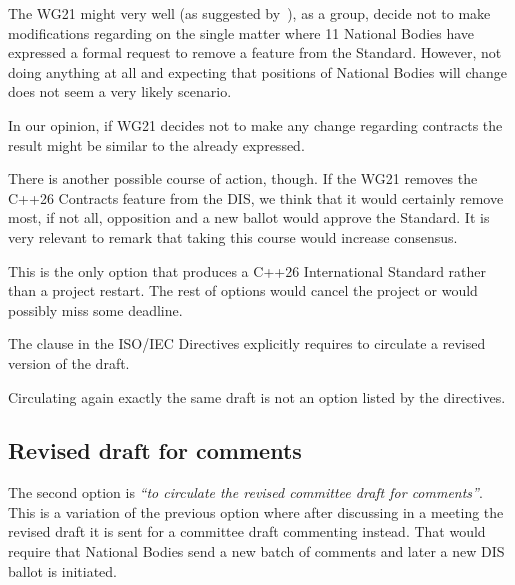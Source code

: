 The WG21 might very well (as suggested by~\cite{p4433r0}), as a group, decide
not to make modifications regarding on the single matter where 11 National
Bodies have expressed a formal request to remove a feature from the Standard.
However, not doing anything at all and expecting that positions of National
Bodies will change does not seem a very likely scenario.

In our opinion, if WG21 decides not to make any change regarding contracts the
result might be similar to the already expressed.

There is another possible course of action, though. If the WG21 removes the
C++26 Contracts feature from the DIS, we think that it would certainly
remove most, if not all, opposition and a new ballot would approve the Standard.
It is very relevant to remark that taking this course would increase consensus.

\vspace{1em}
\begin{tcolorbox}[
  colback=green!8!white,
  colframe=green!50!black,
  title={\textbf{Positive impact}},
  breakable,
  width=\textwidth,
  boxrule=0.5pt
  ]
This is the only option that produces a C++26 International Standard rather than
a project restart. The rest of options would cancel the project or would
possibly miss some deadline.
\end{tcolorbox}
\vspace{1em}

\vspace{1em}
\begin{tcolorbox}[
  colback=orange!8!white,
  colframe=orange,
  title={\textbf{Important Observation}},
  breakable,
  width=\textwidth,
  boxrule=0.5pt
  ]
The clause in the ISO/IEC Directives explicitly requires to circulate a revised
version of the draft. 

Circulating again exactly the same draft is not an option listed by the
directives.
\end{tcolorbox}
\vspace{1em}


\subsection{Revised draft for comments}

The second option is \emph{``to circulate the revised committee draft for
comments''}. This is a variation of the previous option where after discussing
in a meeting the revised draft it is sent for a committee draft commenting
instead. That would require that National Bodies send a new batch of comments
and later a new DIS ballot is initiated.

